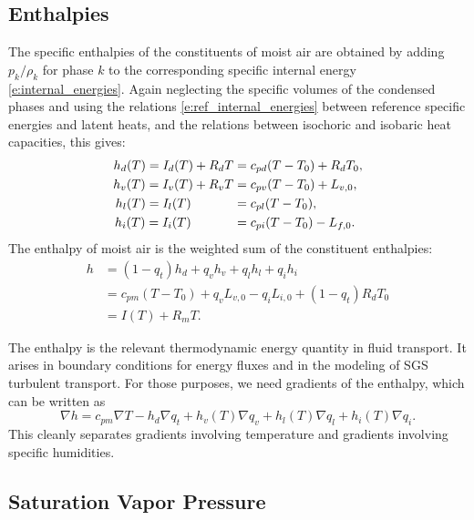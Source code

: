 \documentclass{article}
\begin{document}
\subsection{Enthalpies}\label{s:enthalpies}

The specific enthalpies of the constituents of moist air are obtained by adding $p_k/\rho_k$ for phase $k$ to the corresponding specific internal energy \eqref{e:internal_energies}. Again neglecting the specific volumes of the condensed phases and using the relations \eqref{e:ref_internal_energies} between reference specific energies and latent heats, and the relations between isochoric and isobaric heat capacities, this gives:
\begin{subequations}
\begin{align}
    h_d(T) = I_d(T) + R_d T &= c_{pd}(T-T_0) + R_d T_0, \\
    h_v(T) = I_v(T) + R_v T &= c_{pv}(T-T_0) + L_{v,0}, \\
    h_l(T) = I_l(T) \hphantom{{\,}+ R_d T} &= c_{pl}(T-T_0), \\
    h_i(T) = I_i(T) \hphantom{{\,}+ R_d T} &= c_{pi}(T-T_0) - L_{f,0}.
\end{align}
\end{subequations}
The enthalpy of moist air is the weighted sum of the constituent enthalpies:
\begin{equation}
\begin{split}
    h   &= (1-q_t) h_d + q_v h_v + q_l h_l + q_i h_i \\
        &= c_{pm} (T-T_0) + q_v L_{v,0} - q_i L_{i,0} + (1-q_t) R_d T_0\\
        &= I(T) + R_m T.
\end{split}
\end{equation}

The enthalpy is the relevant thermodynamic energy quantity in fluid transport. It arises in boundary conditions for energy fluxes and in the modeling of SGS turbulent transport. For those purposes, we need gradients of the enthalpy, which can be written as 
\begin{equation}\label{e:enthalpy_gradient}
    \nabla h = c_{pm} \nabla T - h_d \nabla q_t
    + h_v(T) \nabla q_v + h_l(T) \nabla q_l + h_i(T) \nabla q_i.
\end{equation}
This cleanly separates gradients involving temperature and gradients involving specific humidities.

\subsection{Saturation Vapor Pressure}
\end{document}

